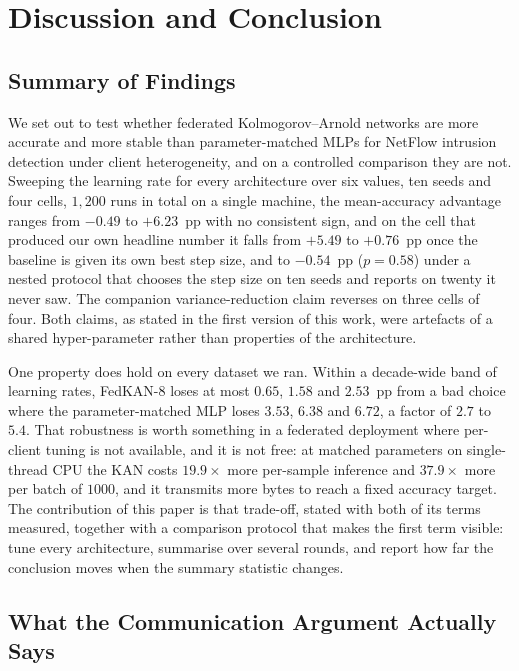 \section{Discussion and Conclusion}\label{sec:conclusion}

\subsection{Summary of Findings}

We set out to test whether federated Kolmogorov--Arnold networks are more accurate and more
stable than parameter-matched MLPs for NetFlow intrusion detection under client heterogeneity,
and on a controlled comparison they are not. Sweeping the learning rate for every architecture
over six values, ten seeds and four cells, $1{,}200$ runs in total on a single machine, the mean-accuracy advantage ranges from $-0.49$ to $+6.23$~pp with no consistent sign, and on the cell that produced our own headline number it falls from $+5.49$ to $+0.76$~pp once the baseline is given its own best step size, and to $-0.54$~pp ($p=0.58$) under a nested protocol that chooses the step size on ten seeds and reports on twenty it never saw. The companion variance-reduction claim reverses on
three cells of four. Both claims, as stated in the first version of this work, were artefacts
of a shared hyper-parameter rather than properties of the architecture.

One property does hold on every dataset we ran. Within a decade-wide band of learning rates,
FedKAN-8 loses at most $0.65$, $1.58$ and $2.53$~pp from a bad choice where the
parameter-matched MLP loses $3.53$, $6.38$ and $6.72$, a factor of $2.7$ to $5.4$. That
robustness is worth something in a federated deployment where per-client tuning is not
available, and it is not free: at matched parameters on single-thread CPU the KAN costs
$19.9\times$ more per-sample inference and $37.9\times$ more per batch of $1000$, and it
transmits more bytes to reach a fixed accuracy target. The contribution of this paper is that
trade-off, stated with both of its terms measured, together with a comparison protocol that
makes the first term visible: tune every architecture, summarise over several rounds, and
report how far the conclusion moves when the summary statistic changes.

\subsection{What the Communication Argument Actually Says}

